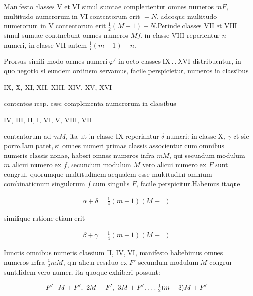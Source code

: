 Manifesto classes V et VI simul sumtae complectentur omnes numeros $mF$, multitudo numerorum in VI contentorum erit $=N$, adeoque multitudo numerorum in V contentorum erit $\frac12(M-1)-N$.\quad Perinde classes VII et VIII simul sumtae continebunt omnes numeros $Mf$, in classe VIII reperientur $n$ numeri, in classe VII autem $\frac12(m-1)-n$.

Prorsus simili modo omnes numeri $\varphi'$ in octo classes IX\,.\,.\,XVI distribuentur, in quo negotio si eundem ordinem servamus, facile perspicietur, numeros in classibus

\begin{center}IX, X, XI, XII, XIII, XIV, XV, XVI\end{center}

contentos resp. esse complementa numerorum in classibus

\begin{center}IV, III, II, I, VI, V, VIII, VII\end{center}

contentorum ad $mM$, ita ut in classe IX reperiantur $\delta$ numeri; in classe X, $\gamma$ et sic porro.\quad Iam patet, si omnes numeri primae classis associentur cum omnibus numeris classis nonae, haberi omnes numeros infra $mM$, qui secundum modulum $m$ alicui numero ex $f$, secundum modulum $M$ vero alicui numero ex $F$ sunt congrui, quorumque multitudinem aequalem esse multitudini omnium combinationum singulorum $f$ cum singulis $F$, facile perspicitur.\quad Habemus itaque

\[
\begin{aligned}
\alpha+\delta=\tfrac14(m-1)(M-1)
\end{aligned}
\]

%
similique ratione etiam erit

\[
\begin{aligned}
\beta+\gamma=\tfrac14(m-1)(M-1)
\end{aligned}
\]

Iunctis omnibus numeris classium II, IV, VI, manifesto habebimus omnes numeros infra $\frac12mM$, qui alicui residuo ex $F'$ secundum modulum $M$ congrui sunt.\quad Iidem vero numeri ita quoque exhiberi possunt:

\[
\begin{aligned}
F',\ M+F',\ 2M+F',\ 3M+F'\mathinner{.\,.\,.\,.}\tfrac12(m-3)M+F'
\end{aligned}
\]

